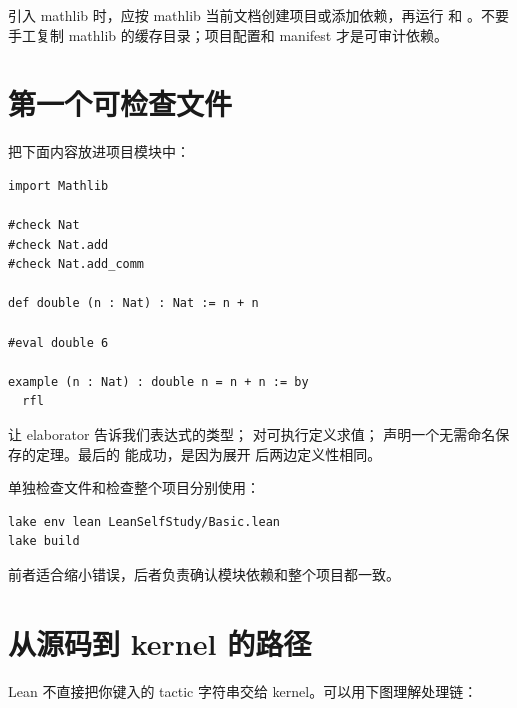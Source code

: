 引入 mathlib 时，应按 mathlib 当前文档创建项目或添加依赖，再运行  和 。不要手工复制 mathlib 的缓存目录；项目配置和 manifest 才是可审计依赖。

\section{第一个可检查文件}

把下面内容放进项目模块中：
\begin{lstlisting}
import Mathlib

#check Nat
#check Nat.add
#check Nat.add_comm

def double (n : Nat) : Nat := n + n

#eval double 6

example (n : Nat) : double n = n + n := by
  rfl
\end{lstlisting}

 让 elaborator 告诉我们表达式的类型； 对可执行定义求值； 声明一个无需命名保存的定理。最后的  能成功，是因为展开  后两边定义性相同。

单独检查文件和检查整个项目分别使用：
\begin{lstlisting}[language={}]
lake env lean LeanSelfStudy/Basic.lean
lake build
\end{lstlisting}
前者适合缩小错误，后者负责确认模块依赖和整个项目都一致。

\section{从源码到 kernel 的路径}

Lean 不直接把你键入的 tactic 字符串交给 kernel。可以用下图理解处理链：
\begin{center}
\end{center}

